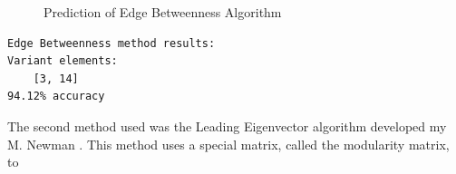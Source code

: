 \begin{figure}[h!]
\centering
{}
\caption{Prediction of Edge Betweenness Algorithm}
\label{fig:graph_eb}
\end{figure}

\begin{verbatim}
Edge Betweenness method results: 
Variant elements:
	[3, 14]
94.12% accuracy
\end{verbatim}

\clearpage

The second method used was the Leading Eigenvector algorithm developed my M. Newman \cite{new06}. This method uses a special matrix, called the modularity matrix, to

